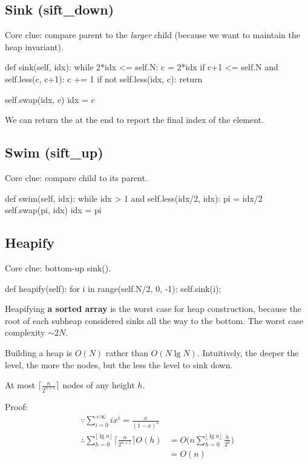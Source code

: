 \subsection{Sink (sift\_down)}
Core clue: compare parent to the \textit{larger} child (because we want to maintain the heap invariant). 
\begin{python}
def sink(self, idx):
    while 2*idx <= self.N:
        c = 2*idx
        if c+1 <= self.N and self.less(c, c+1):
            c += 1
        if not self.less(idx, c):
            return 

        self.swap(idx, c)
        idx = c
\end{python}
We can return the  at the end to report the final index of the element. 
\subsection{Swim (sift\_up)}
Core clue: compare child to its parent. 
\begin{python}
def swim(self, idx):
    while idx > 1 and self.less(idx/2, idx):
        pi = idx/2
        self.swap(pi, idx)
        idx = pi
\end{python}
\subsection{Heapify}
Core clue: bottom-up sink().
\begin{python}
def heapify(self):
    for i in range(self.N/2, 0, -1):
        self.sink(i);
\end{python}
 Heapifying \textbf{a sorted array} is the worst case for heap construction, because the root of each subheap considered sinks all the way to the bottom. The worst case complexity $\sim 2N$. 

Building a heap is $O(N)$ rather than $O(N \lg N)$. Intuitively, the deeper the level, the more the nodes, but the less the level to sink down. 

At most $\big\lceil\frac{n}{2^{h+1}}\big\rceil$ nodes of any height $h$.

Proof:
\begin{align*}
\because \sum_{i=0}^{+\infty} {ix^i} =\frac{x}{(1-x)^2} \\
\therefore \sum_{h=0}^{\lfloor\lg n\rfloor}{\Big\lceil\frac{n}{2^{h+1}}\Big\rceil
O(h)} &= O\Bigg(n\sum_{h=0}^{\lfloor\lg n\rfloor}{\frac{h}{2^h}}\Bigg) \\
&= O(n)
\end{align*}
